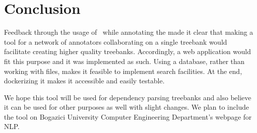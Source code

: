 \section{Conclusion}
\label{sec:conclusion}
Feedback through the usage of \boatvone\ while annotating the \bountreebank{} made it clear that making a tool for a network of annotators collaborating on a single treebank would facilitate creating higher quality treebanks.
Accordingly, a web application would fit this purpose and it was implemented as such.
Using a database, rather than working with \conllu{} files, makes it feasible to implement search facilities.
At the end, dockerizing it makes it accessible and easily testable.

We hope this tool will be used for dependency parsing treebanks and also believe it can be used for other purposes as well with slight changes.
We plan to include the tool on Bogazici University Computer Engineering Department's webpage for NLP.
